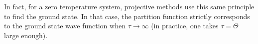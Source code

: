 %
%
In fact, for a zero temperature system, projective methods use this same principle to find the ground state.
In that case, the partition function strictly corresponds to the ground state wave function when $\tau \rightarrow \infty$ (in practice, one takes $\tau = \Theta$ large enough).
 

